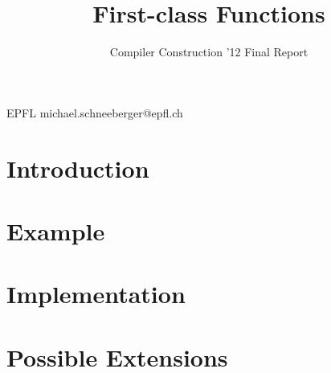 \documentclass[nocopyrightspace,11pt,authoryear,preprint]{sigplanconf}
\begin{document}


\title{First-class Functions}
\subtitle{Compiler Construction '12 Final Report}

           {EPFL}
           {michael.schneeberger@epfl.ch}

\maketitle

\section{Introduction}


\section{Example}


\section{Implementation}


\section{Possible Extensions}




\end{document}
